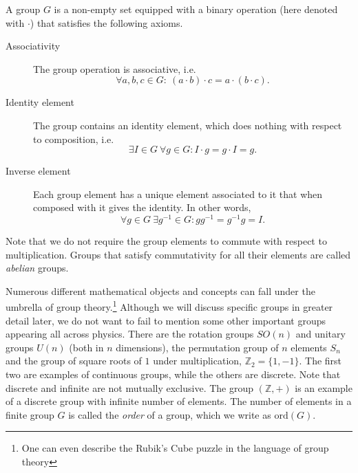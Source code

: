 \begin{defn}[Group]\label{defn:group}
  A group $G$ is a non-empty set equipped with a binary operation (here denoted
  with $\cdot$) that satisfies the following axioms.
  \begin{description}
    \item[Associativity] The group operation is associative, i.e.
      $$\forall a,b,c \in G:\ (a\cdot b) \cdot c = a \cdot
      (b \cdot c).$$
    \item[Identity element] The group contains an identity element, which does
      nothing with respect to composition, i.e.
      $$\exists I\in G \ \forall g \in G : I\cdot g = g \cdot I = g.$$
    \item[Inverse element] Each group element has a unique element associated
      to it that when composed with it gives the identity. In other words,
      $$\forall g \in G \ \exists g^{-1} \in G : g g^{-1} = g^{-1} g = I.$$
  \end{description}
\end{defn}

Note that we do not require the group elements to commute with respect to
multiplication. Groups that satisfy commutativity for all their elements are
called \emph{abelian} groups.

Numerous different mathematical objects and concepts can fall under the
umbrella of group theory.\footnote{One can even describe the Rubik's Cube
puzzle in the language of group theory} Although we will discuss specific
groups in greater detail later, we do not want to fail to mention some other
important groups appearing all across physics. There are the rotation groups
$SO(n)$ and unitary groups $U(n)$ (both in $n$ dimensions), the permutation
group of $n$ elements $S_n$ and the group of square roots of $1$ under
multiplication, $\mathbb{Z}_2 = \{1, -1\}$.  The first two are examples of
continuous groups, while the others are discrete. Note that discrete and
infinite are not mutually exclusive. The group $(\mathbb{Z}, +)$ is an example
of a discrete group with infinite number of elements.
The number of elements in a finite group $G$ is
called the \emph{order} of a group, which we write as $\mathrm{ord}(G)$.

